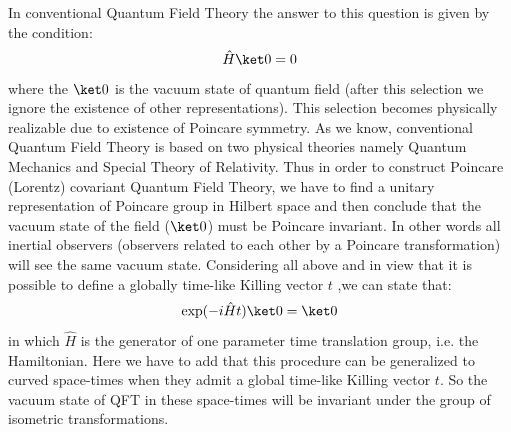 \documentclass[12pt]{article}
\begin{document}
 In conventional Quantum Field Theory the answer to this question is given by the condition:
 \begin{equation}\label{eqn.vacuum1}
   \hat{H}\ket0=0
 \end{equation}
 where the $\ket0$ is the vacuum state of quantum field (after this selection we ignore the existence of other representations). This selection becomes physically realizable due to existence of Poincare symmetry. As we know, conventional Quantum Field Theory is based on two physical theories namely Quantum Mechanics and Special Theory of Relativity. Thus in order to construct Poincare (Lorentz) covariant Quantum Field Theory, we have to find a unitary representation of Poincare group in Hilbert space and then conclude that the vacuum state of the field ($\ket0$) must be Poincare invariant. In other words all inertial observers (observers related to each other by a Poincare transformation) will see the same vacuum state.
Considering all above and in view that it is possible to define a globally time-like Killing vector $t$ ,we can state that:
\begin{equation}
      \exp (-i\hat{H}t)\ket0=\ket0
\end{equation}
in which $\hat{H}$ is the generator of one parameter time translation group, i.e. the Hamiltonian. 
Here we have to add that this procedure can be generalized to curved space-times when they admit a global time-like Killing vector $t$. So the vacuum state of QFT in these space-times will be invariant under the group of isometric transformations.
\end{document}
